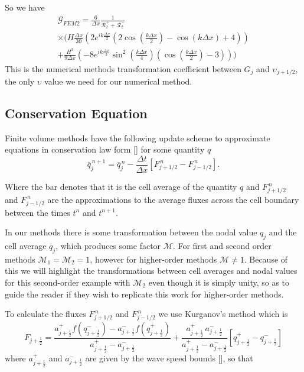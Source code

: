  
 So we have 
  \begin{multline*}
  \mathcal{G}_{FEM2}  = \frac{6}{\Delta x} \frac{1}{\mathcal{R}^+_2 +\mathcal{R}^-_2} \\ \times \Bigg(H\frac{\Delta x}{30} \left(2e^{ik\frac{\Delta x}{2}} \left(2\cos\left(\frac{k \Delta x}{2}\right) - \cos\left({k \Delta x}\right) + 4\right)\right) \\+ \frac{H^3 }{9\Delta x}\left(-8e^{ik\frac{\Delta x}{2}} \sin^2\left(\frac{k \Delta x}{4}\right)\left(\cos\left(\frac{k \Delta x}{2}\right) - 3 \right) \right)   \Bigg)
  \end{multline*}
 This is the numerical methods transformation coefficient between $G_j$ and $\upsilon_{j+1/2}$, the only $\upsilon$ value we need for our numerical method. 


\subsection{Conservation Equation}
Finite volume methods have the following update scheme to approximate equations in conservation law form [] for some quantity $q$
\begin{equation}
\label{eqn:ConUpdateForm}
\bar{q}^{\,n + 1}_{j} = \bar{q}^{\,n}_{j} - \frac{\Delta t}{\Delta x} \left[F^{\,n} _{j+1/2} - F^{\,n} _{j-1/2} \right].
\end{equation}


Where the bar denotes that it is the cell average of the quantity $q$ and $F^{\,n} _{j+1/2}$ and $F^{\,n} _{j-1/2}$ are the approximations to the average fluxes across the cell boundary between the times $t^n$ and $t^{n+1}$. 

In our methods there is some transformation between the nodal value $q_j$ and the cell average $\bar{q}_j$, which produces some factor $\mathcal{M}$. For first and second order methods $\mathcal{M}_1 = \mathcal{M}_2 = 1$, however for higher-order methods $\mathcal{M} \neq 1$. Because of this we will highlight the transformations between cell averages and nodal values for this second-order example with $\mathcal{M}_2$ even though it is simply unity, so as to guide the reader if they wish to replicate this work for higher-order methods.

To calculate the fluxes $F^{\,n} _{j+1/2}$ and $F^{\,n} _{j-1/2}$ we use Kurganov's method \cite{Kurganov-etal-2001-707} which is 
\begin{equation*}
F_{j+\frac{1}{2}} = \dfrac{a^+_{j+\frac{1}{2}} f\left(q^-_{j+\frac{1}{2}}\right) - a^-_{j+\frac{1}{2}} f\left(q^+_{j+\frac{1}{2}}\right)}{a^+_{j+\frac{1}{2}} - a^-_{j+\frac{1}{2}}}  + \dfrac{a^+_{j+\frac{1}{2}} \, a^-_{j+\frac{1}{2}}}{a^+_{j+\frac{1}{2}} - a^-_{j+\frac{1}{2}}} \left [ q^+_{j+\frac{1}{2}} - q^-_{j+\frac{1}{2}} \right ]
\end{equation*}
where $a^+_{j+\frac{1}{2}}$ and $a^-_{j+\frac{1}{2}}$ are given by the wave speed bounds [], so that 

